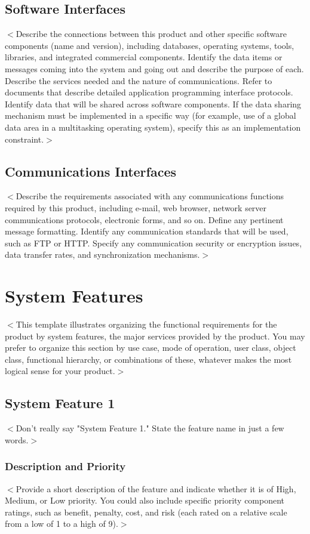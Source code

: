 \documentclass[a4paper, 11pt]{scrreprt}
\begin{document}
\section{Software Interfaces}
$<$Describe the connections between this product and other specific software 
components (name and version), including databases, operating systems, tools, 
libraries, and integrated commercial components. Identify the data items or 
messages coming into the system and going out and describe the purpose of each.  
Describe the services needed and the nature of communications. Refer to 
documents that describe detailed application programming interface protocols.  
Identify data that will be shared across software components. If the data 
sharing mechanism must be implemented in a specific way (for example, use of a 
global data area in a multitasking operating system), specify this as an 
implementation constraint.$>$

\section{Communications Interfaces}
$<$Describe the requirements associated with any communications functions 
required by this product, including e-mail, web browser, network server 
communications protocols, electronic forms, and so on. Define any pertinent 
message formatting. Identify any communication standards that will be used, such 
as FTP or HTTP. Specify any communication security or encryption issues, data 
transfer rates, and synchronization mechanisms.$>$


\chapter{System Features}
$<$This template illustrates organizing the functional requirements for the 
product by system features, the major services provided by the product. You may 
prefer to organize this section by use case, mode of operation, user class, 
object class, functional hierarchy, or combinations of these, whatever makes the 
most logical sense for your product.$>$

\section{System Feature 1}
$<$Don't really say "System Feature 1." State the feature name in just a few 
words.$>$

\subsection{Description and Priority}
$<$Provide a short description of the feature and indicate whether it is of 
High, Medium, or Low priority. You could also include specific priority 
component ratings, such as benefit, penalty, cost, and risk (each rated on a 
relative scale from a low of 1 to a high of 9).$>$
\end{document}
